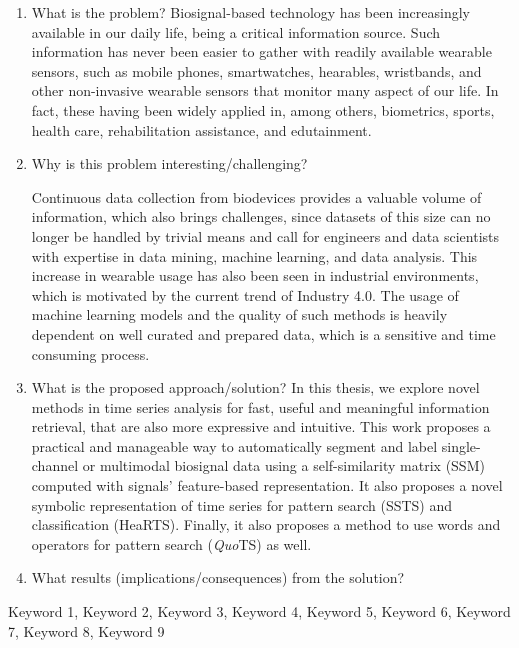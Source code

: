 \begin{enumerate}
  \item What is the problem?
Biosignal-based technology has been increasingly available in our daily life, being a critical information source. Such information has never been easier to gather with readily available wearable sensors, such as mobile phones,  smartwatches, hearables, wristbands, and other non-invasive wearable sensors that monitor many aspect of our life. In fact, these having been widely applied in, among others, biometrics, sports, health care, rehabilitation assistance, and edutainment. 

\item Why is this problem interesting/challenging?

Continuous data collection from biodevices provides a valuable volume of information, which also brings challenges, since datasets of this 
size can no longer be handled by trivial means and call for engineers and data scientists with expertise in data mining, machine learning, and data analysis. This increase in wearable usage has also been seen in industrial environments, which is motivated by the current trend of Industry 4.0. The usage of machine learning models and the quality of such methods is heavily dependent on well curated and prepared data, which is a sensitive and time consuming process. 

\item What is the proposed approach/solution?
In this thesis, we explore novel methods in time series analysis for fast, useful and meaningful information retrieval, that are also more expressive and intuitive. This work proposes a practical and manageable way to automatically segment and label single-channel or multimodal biosignal data using a self-similarity matrix (SSM) computed with signals' feature-based representation. It also proposes a novel symbolic representation of time series for pattern search (SSTS) and classification (HeaRTS). Finally, it also proposes a method to use words and operators for pattern search (\textit{Quo}TS) as well.

\item What results (implications/consequences) from the solution?
\end{enumerate}

\begin{keywords}
Keyword 1, Keyword 2, Keyword 3, Keyword 4, Keyword 5, Keyword 6, Keyword 7, Keyword 8, Keyword 9
\end{keywords} 
